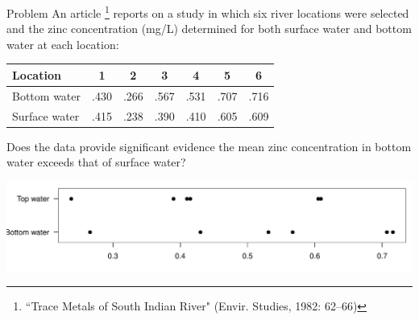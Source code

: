 \documentclass[handout]{beamer}
\begin{document}
\begin{frame}{Problem}
An article \footnote{``Trace Metals of South Indian River" (Envir.
Studies, 1982: 62--66)} reports on a study in which six river locations were selected
and the zinc concentration (mg/L) determined for both
surface water and bottom water at each location:

\begin{center}
\begin{tabular}{l|cccccc}
Location & 1 & 2 & 3 & 4 & 5 & 6 \\ \hline
Bottom water &
.430 & .266 & .567 & .531 & .707 & .716 \\ \hline
Surface water &
.415 & .238 & .390 & .410 & .605 & .609 \\ \hline
\end{tabular}
\end{center}

\pause \begin{block}{}
Does the data provide significant evidence the mean zinc concentration in bottom water exceeds that of surface water?
\end{block}

\pause 
\vspace{-.6cm}
\begin{center}
\includegraphics[scale=.5]{ch9_dotplot2.pdf}
\end{center}
\end{frame}
\end{document}
